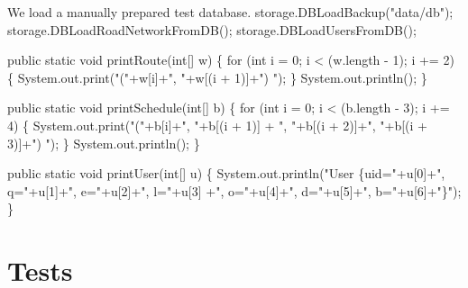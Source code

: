 \documentclass{article}
\def\nwendcode{\endtrivlist \endgroup}
\let\nwdocspar=\par
\begin{document}
\nwendcode{}We load a manually prepared test database.
\nwenddocs{}\endmoddef{}
storage.DBLoadBackup("data/db");
storage.DBLoadRoadNetworkFromDB();
storage.DBLoadUsersFromDB();
\nwendcode{}\nwdocspar

\nwenddocs{}\endmoddef{}
public static void printRoute(int[] w) \{
  for (int i = 0; i < (w.length - 1); i += 2) \{
    System.out.print("("+w[i]+", "+w[(i + 1)]+") ");
  \}
  System.out.println();
\}

public static void printSchedule(int[] b) \{
  for (int i = 0; i < (b.length - 3); i += 4) \{
    System.out.print("("+b[i]+", "+b[(i + 1)]
      + ", "+b[(i + 2)]+", "+b[(i + 3)]+") ");
  \}
  System.out.println();
\}

public static void printUser(int[] u) \{
  System.out.println("User \{uid="+u[0]+", q="+u[1]+", e="+u[2]+", l="+u[3]
    +", o="+u[4]+", d="+u[5]+", b="+u[6]+"\}");
\}
\nwendcode{}\nwdocspar

\section{Tests}
\label{sec:tests}
\end{document}
